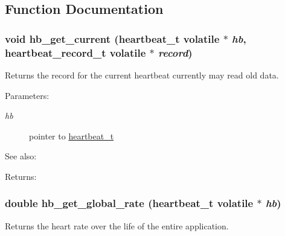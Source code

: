 \subsection{Function Documentation}
\hypertarget{heartbeat-shared_8c_75042acfdcb08a614964eab511fe6299}{
\subsubsection[hb\_\-get\_\-current]{\setlength{\rightskip}{0pt plus 5cm}void hb\_\-get\_\-current ({\bf heartbeat\_\-t} volatile $\ast$ {\em hb}, \/  {\bf heartbeat\_\-record\_\-t} volatile $\ast$ {\em record})}}
\label{heartbeat-shared_8c_75042acfdcb08a614964eab511fe6299}


Returns the record for the current heartbeat currently may read old data. 

\begin{Desc}
\item[Parameters:]
\begin{description}
\item[{\em hb}]pointer to \hyperlink{structheartbeat__t}{heartbeat\_\-t} \end{description}
\end{Desc}
\begin{Desc}
\item[See also:]\end{Desc}
\begin{Desc}
\item[Returns:]\end{Desc}
\hypertarget{heartbeat-shared_8c_55b60b6aa61bbb71ee099f2e7180540e}{
\subsubsection[hb\_\-get\_\-global\_\-rate]{\setlength{\rightskip}{0pt plus 5cm}double hb\_\-get\_\-global\_\-rate ({\bf heartbeat\_\-t} volatile $\ast$ {\em hb})}}
\label{heartbeat-shared_8c_55b60b6aa61bbb71ee099f2e7180540e}


Returns the heart rate over the life of the entire application. 

